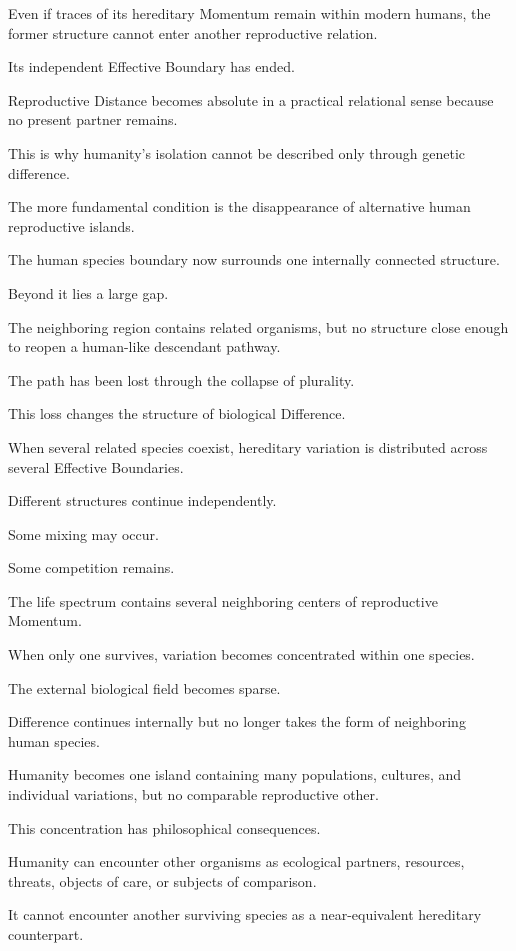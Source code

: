 Even if traces of its hereditary Momentum remain within modern humans, the former structure cannot enter another reproductive relation.

Its independent Effective Boundary has ended.

Reproductive Distance becomes absolute in a practical relational sense because no present partner remains.

This is why humanity’s isolation cannot be described only through genetic difference.

The more fundamental condition is the disappearance of alternative human reproductive islands.

The human species boundary now surrounds one internally connected structure.

Beyond it lies a large gap.

The neighboring region contains related organisms, but no structure close enough to reopen a human-like descendant pathway.

The path has been lost through the collapse of plurality.

This loss changes the structure of biological Difference.

When several related species coexist, hereditary variation is distributed across several Effective Boundaries.

Different structures continue independently.

Some mixing may occur.

Some competition remains.

The life spectrum contains several neighboring centers of reproductive Momentum.

When only one survives, variation becomes concentrated within one species.

The external biological field becomes sparse.

Difference continues internally but no longer takes the form of neighboring human species.

Humanity becomes one island containing many populations, cultures, and individual variations, but no comparable reproductive other.

This concentration has philosophical consequences.

Humanity can encounter other organisms as ecological partners, resources, threats, objects of care, or subjects of comparison.

It cannot encounter another surviving species as a near-equivalent hereditary counterpart.


